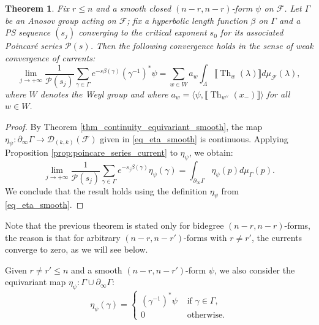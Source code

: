\documentclass[12pt]{amsbook}%
\newtheorem{thm}{Theorem}[chapter]
\theoremstyle{definition}
\theoremstyle{remark}
\numberwithin{section}{chapter}
\numberwithin{subsection}{section}
\numberwithin{figure}{chapter}
\DeclareMathOperator{\Th}{Th}
\newcommand\intcur[1]{\llbracket #1 \rrbracket}
\def\cF{{\mathscr{F}}}
\def\cP{{\mathscr{P}}}
\def\Ga{\Gamma}
\def\La{\Lambda}
\def\la{\lambda}
\begin{document}
{{\begin{thm} \label{thm_equidistribution_smooth} Fix $r \leqslant n$ and a smooth closed $(n-r,n-r)$-form $\psi$ on $\mathcal{F}$. Let $\Gamma$ be an Anosov group acting on  $\mathcal{F}$; fix a hyperbolic length function $\beta$ on $\Ga$ %
and  a  PS sequence $(s_j)$ converging to the critical exponent $s_0$ for its associated Poincar\'e series $\mathcal{P}(s)$. 
Then the following convergence holds in the sense of weak convergence of currents: 
\begin{equation}
\lim_{j\rightarrow +\infty} \dfrac{1}{\cP(s_j)} \sum_{\gamma \in \Gamma} e^{-s \beta(\gamma)} (\gamma^{-1})^* \psi = 
\sum_{w\in W} a_w \int_{\La} \llbracket \Th_w (\la)\rrbracket d\mu_{\cF}(\la),
\end{equation}
 where $W$ denotes the Weyl group and where $a_w = \langle \psi, \intcur{\Th_{w^\vee}(x_-)} \rangle $ for all $w\in W$. %
\end{thm}


\begin{proof} By Theorem \ref{thm_continuity_equivariant_smooth}, the map $\eta_\psi \colon \partial_\infty \Gamma \to \mathcal{D}_{(k,k)}(\cF)$ given in \eqref{eq_eta_smooth} is continuous.  Applying Proposition \ref{prop:poincare_series_current} to $\eta_\psi$, we obtain: 
\begin{equation*}
\lim_{j\rightarrow +\infty} \dfrac{1}{\cP(s_j)} \sum_{\gamma \in \Gamma} e^{-s_j \beta(\gamma)} \eta_\psi(\gamma) = \int_{\partial_\infty \Gamma} \eta_\psi(p) d\mu_{\Ga}(p).
\end{equation*}
We conclude that the result holds using the definition $\eta_\psi$ from \eqref{eq_eta_smooth}. 
\end{proof}


Note that the previous theorem is stated only for bidegree $(n-r,n-r)$-forms, the reason is that for arbitrary $(n-r, n-r')$-forms with $r \neq r'$, the currents converge to zero, as we will see below. 

Given $r \neq r' \leqslant n$ and a smooth $(n-r,n-r')$-form $\psi$, we also consider  the equivariant map $\eta_{\psi} \colon \Gamma \cup \partial_\infty \Gamma $: 
\begin{equation*}
\eta_{\psi} (\gamma) = \left  \lbrace \begin{array}{ll}
(\gamma^{-1})^* \psi & \text{ if } \gamma \in \Gamma, \\
 0  & \text{ otherwise.}
\end{array} \right .
\end{equation*}


}}
\end{document}
